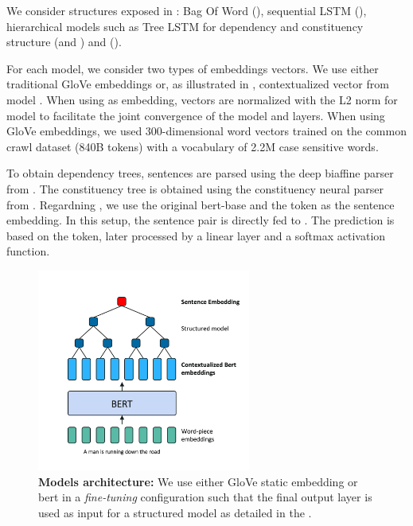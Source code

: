 We consider structures exposed in : Bag Of Word (\bow), sequential LSTM (\seq), hierarchical models such as Tree LSTM for dependency and constituency structure (\dep and \const) and \bert (\cls).

For each model, we consider two types of embeddings vectors. We use either traditional GloVe embeddings \parencite{pennington_14} or, as illustrated in , contextualized vector from \bert model \parencite{devlin_19}. When using \bert as embedding, vectors are normalized with the L2 norm for \bow model to facilitate the joint convergence of the model and \bert layers. When using GloVe embeddings, we used 300-dimensional word vectors trained on the common crawl dataset (840B tokens) with a vocabulary of 2.2M case sensitive words.

To obtain dependency trees, sentences are parsed using the deep biaffine parser from \textcite{dozat_17}. The constituency tree is obtained using the constituency neural parser from \textcite{klein_18}. Regardning \bert, we use the original bert-base and the \cls token as the sentence embedding. In this setup, the sentence pair is directly fed to \bert. The prediction is based on the \cls token, later processed by a linear layer and a softmax activation function.

\begin{figure}[!htb]
\begin{center}
\includegraphics[width=7cm]{images/model-struct.png}
\end{center}
\caption{\textbf{Models architecture:} We use either GloVe static embedding or bert in a \textit{fine-tuning} configuration such that the final output layer is used as input for a structured model as detailed in the .}
\end{figure}

